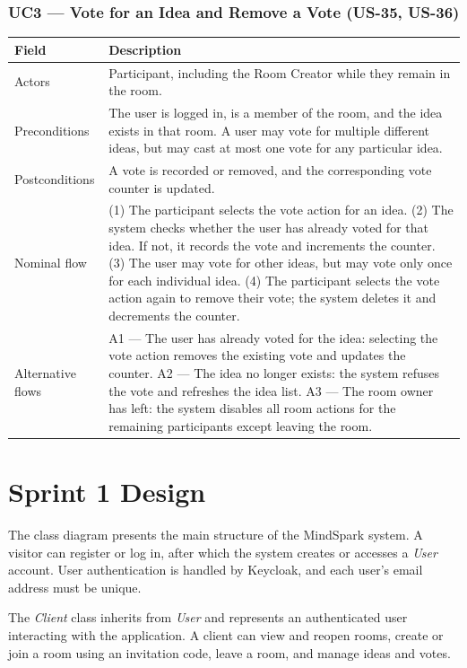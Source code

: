 \documentclass[12pt,a4paper]{report}
\begin{document}
\subsubsection{UC3 --- Vote for an Idea and Remove a Vote (US-35, US-36)}
\begin{tabularx}{\textwidth}{|p{}|Y|}\hline
\textbf{Field} & \textbf{Description} \\\hline
Actors & Participant, including the Room Creator while they remain in the room. \\\hline
Preconditions & The user is logged in, is a member of the room, and the idea exists in that room. A user may vote for multiple different ideas, but may cast at most one vote for any particular idea. \\\hline
Postconditions & A vote is recorded or removed, and the corresponding vote counter is updated. \\\hline
Nominal flow & (1) The participant selects the vote action for an idea. (2) The system checks whether the user has already voted for that idea. If not, it records the vote and increments the counter. (3) The user may vote for other ideas, but may vote only once for each individual idea. (4) The participant selects the vote action again to remove their vote; the system deletes it and decrements the counter. \\\hline
Alternative flows & A1 --- The user has already voted for the idea: selecting the vote action removes the existing vote and updates the counter. A2 --- The idea no longer exists: the system refuses the vote and refreshes the idea list. A3 --- The room owner has left: the system disables all room actions for the remaining participants except leaving the room. \\\hline
\end{tabularx}

\section{Sprint 1 Design}
The class diagram presents the main structure of the MindSpark system. A visitor can register or log in, after which the system creates or accesses a \textit{User} account. User authentication is handled by Keycloak, and each user's email address must be unique.

The \textit{Client} class inherits from \textit{User} and represents an authenticated user interacting with the application. A client can view and reopen rooms, create or join a room using an invitation code, leave a room, and manage ideas and votes.
\end{document}
